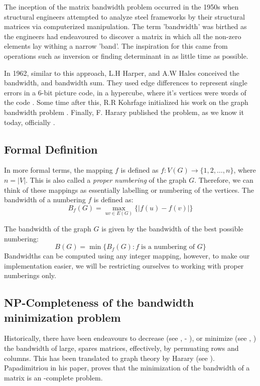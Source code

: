 \documentclass[conference,compsoc]{IEEEtran}
\begin{document}
The inception of the matrix bandwidth problem occurred in the 1950s when structural engineers 
attempted to analyze steel frameworks by their structural matrices via computerized manipulation. The term 'bandwidth' 
was birthed as the engineers had endeavoured to discover a matrix in which all the non-zero elements 
lay withing a narrow 'band'. The inspiration for this came from operations such as 
inversion or finding determinant in as little time as possible.

In 1962, similar to this approach, L.H Harper, and A.W Hales conceived the bandwidth, 
and bandwidth sum. They used edge differences to represent single errors in a 6-bit picture code, 
in a hypercube, where it's vertices were words of the code \cite{10.2307/2946514}. Some time after this, 
R.R Kohrfage initialized his work on the graph bandwidth problem \cite{ccdg1982}. Finally, F. Harary 
published the problem, as we know it today, officially \cite{https://doi.org/10.1002/bimj.19660080427}.

\subsection{Formal Definition}
In more formal terms, 
the mapping $f$ is defined as $f: V(G) \to \{1, 2, \dots, n\}$, where $n = |V|$. This is also called 
a \emph{proper numbering} of the graph $G$.\cite{Lee2016} Therefore, 
we can think of these mappings as essentially labelling or numbering of the vertices. The bandwidth of a numbering $f$
is defined as:
\begin{equation}
B_f(G) = \max_{uv \in E(G)}\{|f(u) - f(v)|\}
\end{equation}

The bandwidth of the graph $G$ is given by the bandwidth of the best possible numbering:
\begin{equation}
  B(G) = \min \{B_f(G): f \; \text{is a numbering of }  G\}
\end{equation}
Bandwidths can be computed using any integer mapping, however, to make our implementation 
easier, we will be restricting ourselves to working with proper numberings only.

\subsection{NP-Completeness of the bandwidth minimization problem}

Historically, there have been endeavours to decrease (see \cite{10.1145/800195.805928}, - \cite{sparse}), or minimize (see \cite{chen}, \cite{chen2}) 
the bandwidth of large, spares matrices, effectively, by permuating rows and columns. This has been translated to graph theory by Harary (see \cite{1973141}). 
Papadimitriou in his paper, proves that the minimization of the bandwidth of a matrix is an \NP-complete problem. \cite{papadimitriou_1976}
\end{document}
